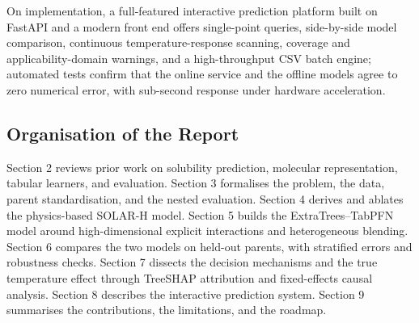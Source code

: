 On implementation, a full-featured interactive prediction platform built on FastAPI and a modern front end offers single-point queries, side-by-side model comparison, continuous temperature-response scanning, coverage and applicability-domain warnings, and a high-throughput CSV batch engine; automated tests confirm that the online service and the offline models agree to zero numerical error, with sub-second response under hardware acceleration.

\subsection{Organisation of the Report}

Section 2 reviews prior work on solubility prediction, molecular representation, tabular learners, and evaluation. Section 3 formalises the problem, the data, parent standardisation, and the nested evaluation. Section 4 derives and ablates the physics-based SOLAR-H model. Section 5 builds the ExtraTrees--TabPFN model around high-dimensional explicit interactions and heterogeneous blending. Section 6 compares the two models on held-out parents, with stratified errors and robustness checks. Section 7 dissects the decision mechanisms and the true temperature effect through TreeSHAP attribution and fixed-effects causal analysis. Section 8 describes the interactive prediction system. Section 9 summarises the contributions, the limitations, and the roadmap.
